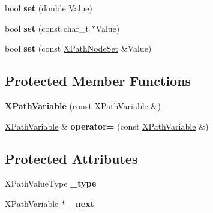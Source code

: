 \begin{DoxyCompactItemize}
\item 
\hypertarget{classphys_1_1xml_1_1XPathVariable_a6a7fb8a3f2028dc239ca1ed56b138df3}{
bool {\bfseries set} (double Value)}
\label{df/dee/classphys_1_1xml_1_1XPathVariable_a6a7fb8a3f2028dc239ca1ed56b138df3}

\item 
\hypertarget{classphys_1_1xml_1_1XPathVariable_a4d85aaa75317bb933823454be708fcbc}{
bool {\bfseries set} (const char\_\-t $\ast$Value)}
\label{df/dee/classphys_1_1xml_1_1XPathVariable_a4d85aaa75317bb933823454be708fcbc}

\item 
\hypertarget{classphys_1_1xml_1_1XPathVariable_a82db794d8380701c587d024501298a51}{
bool {\bfseries set} (const \hyperlink{classphys_1_1xml_1_1XPathNodeSet}{XPathNodeSet} \&Value)}
\label{df/dee/classphys_1_1xml_1_1XPathVariable_a82db794d8380701c587d024501298a51}

\end{DoxyCompactItemize}
\subsection*{Protected Member Functions}
\begin{DoxyCompactItemize}
\item 
\hypertarget{classphys_1_1xml_1_1XPathVariable_a37a47c3f05c4509f83193c1fa1c355e5}{
{\bfseries XPathVariable} (const \hyperlink{classphys_1_1xml_1_1XPathVariable}{XPathVariable} \&)}
\label{df/dee/classphys_1_1xml_1_1XPathVariable_a37a47c3f05c4509f83193c1fa1c355e5}

\item 
\hypertarget{classphys_1_1xml_1_1XPathVariable_a2cd8ec528ae06c55219ac32d0af78eee}{
\hyperlink{classphys_1_1xml_1_1XPathVariable}{XPathVariable} \& {\bfseries operator=} (const \hyperlink{classphys_1_1xml_1_1XPathVariable}{XPathVariable} \&)}
\label{df/dee/classphys_1_1xml_1_1XPathVariable_a2cd8ec528ae06c55219ac32d0af78eee}

\end{DoxyCompactItemize}
\subsection*{Protected Attributes}
\begin{DoxyCompactItemize}
\item 
\hypertarget{classphys_1_1xml_1_1XPathVariable_a039fe72ced3d55be346498846eb29d85}{
XPathValueType {\bfseries \_\-type}}
\label{df/dee/classphys_1_1xml_1_1XPathVariable_a039fe72ced3d55be346498846eb29d85}

\item 
\hypertarget{classphys_1_1xml_1_1XPathVariable_a5425c11d82b053db83a70c0dcb84ea98}{
\hyperlink{classphys_1_1xml_1_1XPathVariable}{XPathVariable} $\ast$ {\bfseries \_\-next}}
\label{df/dee/classphys_1_1xml_1_1XPathVariable_a5425c11d82b053db83a70c0dcb84ea98}

\end{DoxyCompactItemize}
